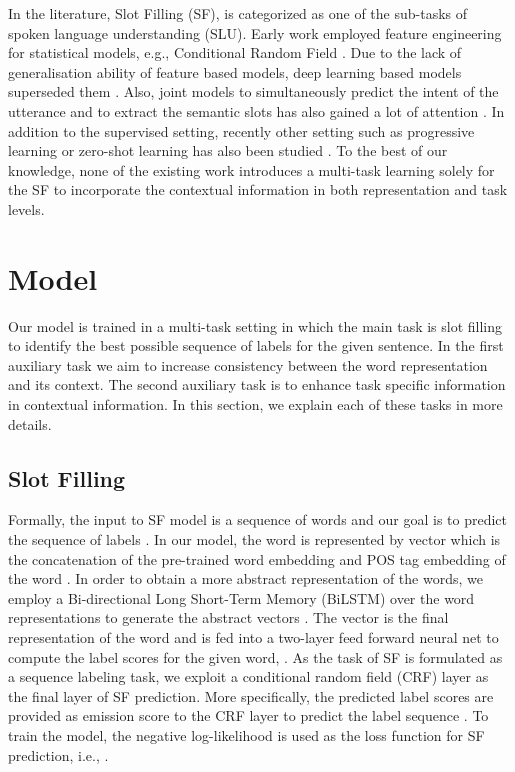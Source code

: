 \documentclass[11pt,a4paper]{article}
\begin{document}
In the literature, Slot Filling (SF), is categorized as one of the sub-tasks of spoken language understanding (SLU). Early work employed feature engineering for statistical models, e.g., Conditional Random Field \cite{raymond:07}. Due to the lack of generalisation ability of feature based models, deep learning based models superseded them \cite{yao:14,Peng:15,kurata:16,hakkani:16}. Also, joint models to simultaneously predict the intent of the utterance and to extract the semantic slots has also gained a lot of attention \cite{guo:14,liu:16,zhang:16,wang:18,goo:18,qin:19,e:19}. In addition to the supervised setting, recently other setting such as progressive learning \cite{shen:19} or zero-shot learning has also been studied \cite{shah:19}. To the best of our knowledge, none of the existing work introduces a multi-task learning solely for the SF to incorporate the contextual information in both representation and task levels.






\section{Model}

Our model is trained in a multi-task setting in which the main task is slot filling to identify the best possible sequence of labels for the given sentence. In the first auxiliary task we aim to increase consistency between the word representation and its context. The second auxiliary task is to enhance task specific information in contextual information. In this section, we explain each of these tasks in more details.

\subsection{Slot Filling}
Formally, the input to SF model is a sequence of words  and our goal is to predict the sequence of labels . In our model, the word  is represented by vector  which is the concatenation of the pre-trained word embedding and POS tag embedding of the word . In order to obtain a more abstract representation of the words, we employ a Bi-directional Long Short-Term Memory (BiLSTM) over the word representations  to generate the abstract vectors . The vector  is the final representation of the word  and is fed into a two-layer feed forward neural net to compute the label scores  for the given word, . As the task of SF is formulated as a sequence labeling task, we exploit a conditional random field (CRF) layer as the final layer of SF prediction. More specifically, the predicted label scores  are provided as emission score to the CRF layer to predict the label sequence . 
To train the model, the negative log-likelihood is used as the loss function for SF prediction, i.e., . 
\end{document}
